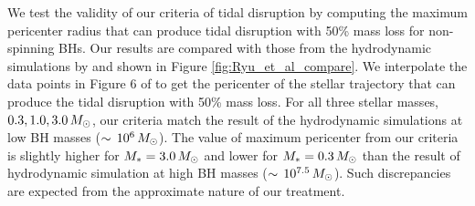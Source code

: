 \documentclass[useAMS,usenatbib]{mn2e}
\def\msun{M_{\rm \odot}}
\def\mstar{M_*}
\def\rp{r_{\rm p}}
\def\Rhm{R_{\rm hm}}
\def\VRL{V_{\rm RL}}
\begin{document}

We test the validity of our criteria of tidal disruption by computing the maximum pericenter radius that can produce tidal disruption with 50\% mass loss for non-spinning BHs. Our results are compared with those from the hydrodynamic simulations by \cite{Ryu2020a,Ryu2020d} and shown in Figure \ref{fig:Ryu_et_al_compare}. We interpolate the data points in Figure 6 of \cite{Ryu2020d} to get the pericenter of the stellar trajectory that can produce the tidal disruption with 50\% mass loss.
For all three stellar masses, $0.3,1.0,3.0\,\msun$, our criteria match the result of the hydrodynamic simulations at low BH masses ($\sim\,10^6\,\msun$).
The value of maximum pericenter from our criteria is slightly higher for $\mstar=3.0\,\msun$ and lower for $\mstar=0.3\,\msun$ than the result of hydrodynamic simulation at high BH masses ($\sim\,10^{7.5}\,\msun$). Such discrepancies are expected from the approximate nature of our treatment.
\end{document}
